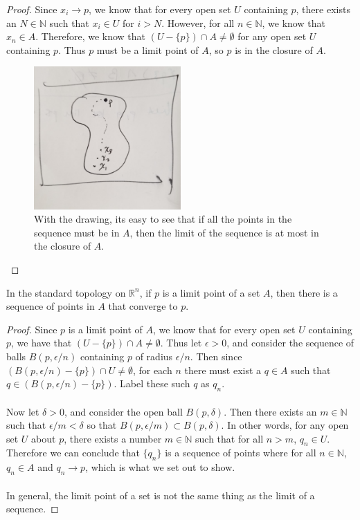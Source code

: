 \documentclass[letterpaper,12pt,twoside]{maths}
\begin{document}
\begin{proof}
    Since $x_i \rightarrow p$, we know that for every open set $U$
    containing $p$, there exists an $N \in \mathbb{N}$ such that $x_i
    \in U$ for $i > N$. However, for all $n \in \mathbb{N}$, we know
    that $x_n \in A$. Therefore, we know that $(U-\{p\}) \cap A \ne
    \emptyset$ for any open set $U$ containing $p$. Thus $p$ must be a
    limit point of $A$, so $p$ is in the closure of $A$.

    \begin{figure}[h!]
        \centering
        \includegraphics[width=0.5\textwidth]{sketch_theorem_3_30.jpg}
        \caption{With the drawing, its easy to see that if all the points
        in the sequence must be in $A$, then the limit of the sequence is
        at most in the closure of $A$.}
    \end{figure}
\end{proof}

\begin{problem}[Theorem 3.31] In the standard topology on
    $\mathbb{R}^n$, if $p$ is a limit point of a set $A$, then there
    is a sequence of points in $A$ that converge to $p$.
\end{problem}

\begin{proof}
    Since $p$ is a limit point of $A$, we know that for every open set
    $U$ containing $p$, we have that $(U - \{p\}) \cap A \ne
    \emptyset$. Thus let $\epsilon > 0$, and consider the sequence of
    balls $B(p, \epsilon/n)$ containing $p$ of radius $\epsilon/n$.
    Then since $(B(p, \epsilon/n) - \{p\}) \cap U \ne \emptyset$, for
    each $n$ there must exist a $q \in A$ such that $q \in (B(p,
    \epsilon/n) - \{p\})$. Label these such $q$ as $q_n$. \\
    \\
    Now let $\delta > 0$, and consider the open ball $B(p, \delta)$.
    Then there exists an $m \in \mathbb{N}$ such that $\epsilon/m <
    \delta$ so that $B(p, \epsilon/m) \subset B(p, \delta).$ In other
    words, for any open set $U$ about $p$, there exists a number $m
    \in \mathbb{N}$ such that for all $n > m$, $q_n \in U$. Therefore
    we can conclude that $\{q_n\}$ is a sequence of points where for
    all $n \in \mathbb{N}$, $q_n \in A$ and $q_n \rightarrow p$, which
    is what we set out to show. \\
    \\
    In general, the limit point of a set is not the same thing as the
    limit of a sequence.
\end{proof}
\end{document}
